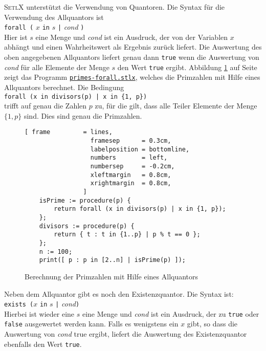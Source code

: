 \textsc{SetlX} unterst\"{u}tzt  die Verwendung von Quantoren.  Die Syntax f\"{u}r die Verwendung
des Allquantors ist
\\[0.2cm]
\hspace*{1.3cm}
\texttt{forall (} $x$ \texttt{in} $s$ \texttt{|} \textsl{cond} \texttt{)}
\\[0.2cm]
Hier ist $s$ eine Menge und \textsl{cond} ist ein Ausdruck, der von der Variablen $x$ abh\"{a}ngt und einen
Wahrheitswert als Ergebnis zur\"{u}ck liefert.  Die Auswertung des oben angegebenen Allquantors liefert genau
dann \texttt{true} wenn die Auswertung von \textsl{cond} f\"{u}r alle Elemente der Menge $s$ den Wert
\texttt{true} ergibt.  Abbildung \ref{fig:primes-forall.stlx} auf Seite
\pageref{fig:primes-forall.stlx} zeigt das Programm
\href{https://github.com/karlstroetmann/Logik/blob/master/SetlX/primes-forall.stlx}{\texttt{primes-forall.stlx}},
welches die  Primzahlen mit Hilfe eines Allquantors berechnet.
Die Bedingung
\\[0.2cm]
\hspace*{1.3cm}
\texttt{forall (x in divisors(p) | x in \{1, p\})}
\\[0.2cm]
trifft auf genau die Zahlen $p$ zu, f\"{u}r die gilt, dass alle Teiler Elemente der Menge $\{1,p\}$ sind.
Dies sind genau die Primzahlen.


\begin{figure}[!ht]
\centering
\begin{Verbatim}[ frame         = lines, 
                  framesep      = 0.3cm, 
                  labelposition = bottomline,
                  numbers       = left,
                  numbersep     = -0.2cm,
                  xleftmargin   = 0.8cm,
                  xrightmargin  = 0.8cm,
                ]
    isPrime := procedure(p) {
        return forall (x in divisors(p) | x in {1, p});
    };
    divisors := procedure(p) {
        return { t : t in {1..p} | p % t == 0 };
    };
    n := 100;
    print([ p : p in [2..n] | isPrime(p) ]);
\end{Verbatim}
\vspace*{-0.3cm}
\caption{Berechnung der Primzahlen mit Hilfe eines Allquantors}
\label{fig:primes-forall.stlx}
\end{figure}

Neben dem Allquantor gibt es noch den Existenzquantor. Die Syntax ist:
\\[0.2cm]
\hspace*{1.3cm}
\texttt{exists (}$x$ \texttt{in} $s$ \texttt{|} \textsl{cond}\texttt{)}
\\[0.2cm]
Hierbei ist wieder eine $s$ eine Menge und \textsl{cond} ist ein Ausdruck, der zu \texttt{true} oder
\texttt{false} ausgewertet werden kann.  Falls es wenigstens ein $x$ gibt, so dass die Auswertung von
\textsl{cond} true ergibt, liefert die Auswertung des Existenzquantor ebenfalls den Wert \texttt{true}.

